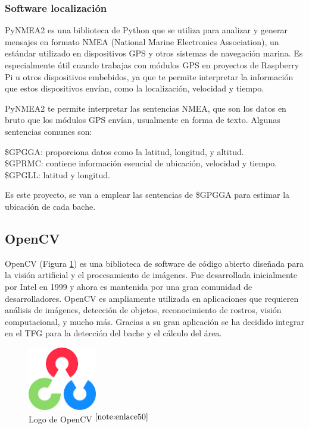 \subsubsection{Software localización}

PyNMEA2 es una biblioteca de Python que se utiliza para analizar y generar mensajes en formato NMEA (National Marine Electronics Association), un estándar utilizado en dispositivos GPS y otros sistemas de navegación marina. Es especialmente útil cuando trabajas con módulos GPS en proyectos de Raspberry Pi u otros dispositivos embebidos, ya que te permite interpretar la información que estos dispositivos envían, como la localización, velocidad y tiempo.

PyNMEA2 te permite interpretar las sentencias NMEA, que son los datos en bruto que los módulos GPS envían, usualmente en forma de texto. Algunas sentencias comunes son:

\$GPGGA: proporciona datos como la latitud, longitud, y altitud.\\
\$GPRMC: contiene información esencial de ubicación, velocidad y tiempo.\\
\$GPGLL: latitud y longitud.

Es este proyecto, se van a emplear las sentencias de \$GPGGA para estimar la ubicación de cada bache.

\subsection{OpenCV}

OpenCV (Figura \ref{fig:opencv}) es una biblioteca de software de código abierto diseñada para la visión artificial y el procesamiento de imágenes. Fue desarrollada inicialmente por Intel en 1999 y ahora es mantenida por una gran comunidad de desarrolladores. OpenCV es ampliamente utilizada en aplicaciones que requieren análisis de imágenes, detección de objetos, reconocimiento de rostros, visión computacional, y mucho más. Gracias a su gran aplicación se ha decidido integrar en el TFG para la detección del bache y el cálculo del área.

\begin{figure} [h!]
	\begin{center}
		\includegraphics[width=3cm]{figs/opencv.png}
	\end{center}
	\caption{Logo de OpenCV $^{\ref{note:enlace50}}$} 
	\label{fig:opencv}
\end{figure}

